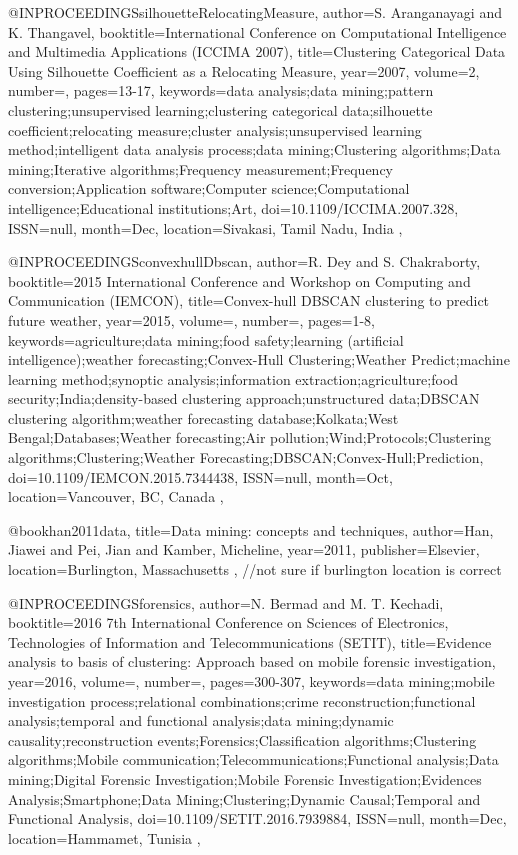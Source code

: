 @INPROCEEDINGS{silhouetteRelocatingMeasure, 
  author={S. {Aranganayagi} and K. {Thangavel}}, 
  booktitle={International Conference on Computational Intelligence and Multimedia Applications (ICCIMA 2007)}, 
  title={Clustering Categorical Data Using Silhouette Coefficient as a Relocating Measure}, 
  year={2007}, 
  volume={2}, 
  number={}, 
  pages={13-17}, 
  keywords={data analysis;data mining;pattern clustering;unsupervised learning;clustering categorical data;silhouette coefficient;relocating measure;cluster analysis;unsupervised learning method;intelligent data analysis process;data mining;Clustering algorithms;Data mining;Iterative algorithms;Frequency measurement;Frequency conversion;Application software;Computer science;Computational intelligence;Educational institutions;Art}, 
  doi={10.1109/ICCIMA.2007.328}, 
  ISSN={null}, 
  month={Dec},
  location={Sivakasi, Tamil Nadu, India }
},

@INPROCEEDINGS{convexhullDbscan, 
  author={R. {Dey} and S. {Chakraborty}}, 
  booktitle={2015 International Conference and Workshop on Computing and Communication (IEMCON)}, 
  title={Convex-hull DBSCAN clustering to predict future weather}, 
  year={2015}, 
  volume={}, 
  number={}, 
  pages={1-8}, 
  keywords={agriculture;data mining;food safety;learning (artificial intelligence);weather forecasting;Convex-Hull Clustering;Weather Predict;machine learning method;synoptic analysis;information extraction;agriculture;food security;India;density-based clustering approach;unstructured data;DBSCAN clustering algorithm;weather forecasting database;Kolkata;West Bengal;Databases;Weather forecasting;Air pollution;Wind;Protocols;Clustering algorithms;Clustering;Weather Forecasting;DBSCAN;Convex-Hull;Prediction}, 
  doi={10.1109/IEMCON.2015.7344438}, 
  ISSN={null}, 
  month={Oct},
  location={Vancouver, BC, Canada}
},


@book{han2011data,
  title={Data mining: concepts and techniques},
  author={Han, Jiawei and Pei, Jian and Kamber, Micheline},
  year={2011},
  publisher={Elsevier},
  location={Burlington, Massachusetts}
},
//not sure if burlington location is correct


@INPROCEEDINGS{forensics, 
  author={N. {Bermad} and M. T. {Kechadi}}, 
  booktitle={2016 7th International Conference on Sciences of Electronics, Technologies of Information and Telecommunications (SETIT)}, 
  title={Evidence analysis to basis of clustering: Approach based on mobile forensic investigation}, 
  year={2016}, 
  volume={}, 
  number={}, 
  pages={300-307}, 
  keywords={data mining;mobile investigation process;relational combinations;crime reconstruction;functional analysis;temporal and functional analysis;data mining;dynamic causality;reconstruction events;Forensics;Classification algorithms;Clustering algorithms;Mobile communication;Telecommunications;Functional analysis;Data mining;Digital Forensic Investigation;Mobile Forensic Investigation;Evidences Analysis;Smartphone;Data Mining;Clustering;Dynamic Causal;Temporal and Functional Analysis}, 
  doi={10.1109/SETIT.2016.7939884}, 
  ISSN={null}, 
  month={Dec},
  location={Hammamet, Tunisia}
},


